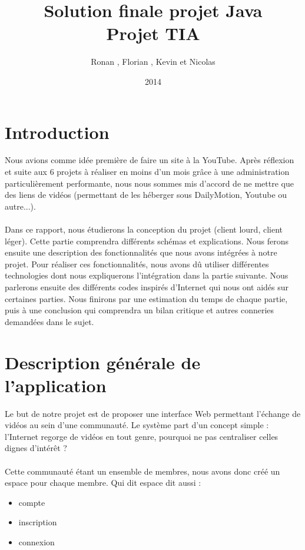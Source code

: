 \documentclass{article}
\title{Solution finale projet Java\\
Projet TIA}
\author{Ronan \bsc{Abhamon}, Florian \bsc{Bigard}, Kevin \bsc{Hivert} et Nicolas \bsc{Reynaud}}
\date{2014}
\begin{document}
\maketitle

\newpage

\renewcommand{\contentsname}{Sommaire}
\tableofcontents
\newpage


\section{Introduction}
Nous avions comme idée première de faire un site à la YouTube. Après réflexion et suite aux 6 projets à réaliser en moins d'un mois grâce à une administration particulièrement performante, nous nous sommes mis d'accord de ne mettre que des liens de vidéos (permettant de les héberger sous DailyMotion, Youtube ou autre...).

\paragraph{}Dans ce rapport, nous étudierons la conception du projet (client lourd, client léger). Cette partie comprendra différents schémas et explications. Nous ferons ensuite une description des fonctionnalités que nous avons intégrées à notre projet. Pour réaliser ces fonctionnalités, nous avons dû utiliser différentes technologies dont nous expliquerons l'intégration dans la partie suivante. Nous parlerons ensuite des différents codes inspirés d'Internet qui nous ont aidés sur certaines parties. Nous finirons par une estimation du temps de chaque partie, puis à une conclusion qui comprendra un bilan critique et autres conneries demandées dans le sujet.



\section{Description générale de l'application}

Le but de notre projet est de proposer une interface Web permettant l'échange de vidéos au sein d'une communauté.
Le système part d'un concept simple : l'Internet regorge de vidéos en tout genre, pourquoi ne pas centraliser celles dignes d'intérêt ?

\paragraph{}
Cette communauté étant un ensemble de membres, nous avons donc créé un espace pour chaque membre. Qui dit espace dit aussi : 
\begin{itemize}
\item compte
\item inscription
\item connexion
\end{itemize}
\end{document}
